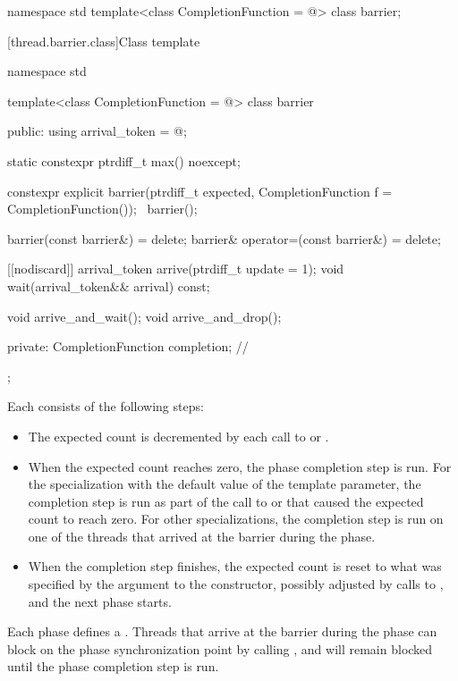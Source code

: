 %
\begin{codeblock}
namespace std {
  template<class CompletionFunction = @\seebelow@>
    class barrier;
}
\end{codeblock}

[thread.barrier.class]{Class template }

\begin{codeblock}
namespace std {
  template<class CompletionFunction = @\seebelow@>
  class barrier {
  public:
    using arrival_token = @\seebelow@;

    static constexpr ptrdiff_t max() noexcept;

    constexpr explicit barrier(ptrdiff_t expected,
                               CompletionFunction f = CompletionFunction());
    ~barrier();

    barrier(const barrier&) = delete;
    barrier& operator=(const barrier&) = delete;

    [[nodiscard]] arrival_token arrive(ptrdiff_t update = 1);
    void wait(arrival_token&& arrival) const;

    void arrive_and_wait();
    void arrive_and_drop();

  private:
    CompletionFunction completion;      // \expos
  };
}
\end{codeblock}

\pnum
Each  consists of the following steps:
\begin{itemize}
\item
  The expected count is decremented
  by each call to  or .
\item
  When the expected count reaches zero, the phase completion step is run.
  For the specialization
  with the default value of the  template parameter,
  the completion step is run
  as part of the call to  or 
  that caused the expected count to reach zero.
  For other specializations,
  the completion step is run on one of the threads
  that arrived at the barrier during the phase.
\item
  When the completion step finishes,
  the expected count is reset
  to what was specified by the  argument to the constructor,
  possibly adjusted by calls to , and
  the next phase starts.
\end{itemize}

%
\pnum
{}%
Each phase defines a .
Threads that arrive at the barrier during the phase
can block on the phase synchronization point by calling , and
will remain blocked until the phase completion step is run.

